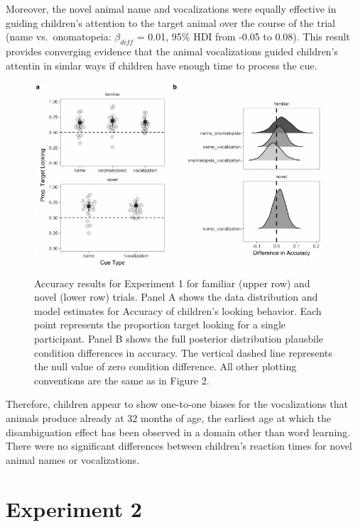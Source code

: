 \documentclass[english,floatsintext,man]{apa6}
\theoremstyle{definition}
\theoremstyle{definition}
\theoremstyle{definition}
\theoremstyle{remark}
\begin{document}
Moreover, the novel animal name and vocalizations were equally effective
in guiding children's attention to the target animal over the course of
the trial (name vs.~onomatopeia: \(\beta_{diff}\) = 0.01, 95\% HDI from
-0.05 to 0.08). This result provides converging evidence that the animal
vocalizations guided children's attentin in simlar ways if children have
enough time to process the cue.

\begin{figure}[t]

{\centering \includegraphics[width=0.85\linewidth]{anime_manuscript_files/figure-latex/acc-plot-e1-1} 

}

\caption{Accuracy results for Experiment 1 for familiar (upper row) and novel (lower row) trials. Panel A shows the data distribution and model estimates for Accuracy of children's looking behavior. Each point represents the proportion target looking for a single participant. Panel B shows the full posterior distribution plausbile condition differences in accuracy. The vertical dashed line represents the null value of zero condition difference. All other plotting conventions are the same as in Figure 2.}\label{fig:acc-plot-e1}
\end{figure}

Therefore, children appear to show one-to-one biases for the
vocalizations that animals produce already at 32 months of age, the
earliest age at which the disambiguation effect has been observed in a
domain other than word learning. There were no significant differences
between children's reaction times for novel animal names or
vocalizations.

\hypertarget{experiment-2}{%
\section{Experiment 2}\label{experiment-2}}
\end{document}
